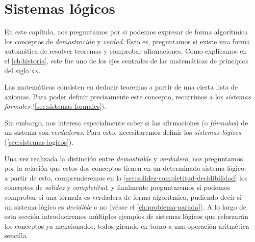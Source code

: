 

\chapter{Sistemas lógicos}\label{ch:sistemas-logicos}

En este capítulo, nos preguntamos por si podemos expresar de forma algorítmica los conceptos de \emph{demostración} y \emph{verdad}. Esto es, preguntamos si existe una forma automática de resolver teoremas y comprobar afirmaciones. Como explicamos en el \cref{ch:historia}, este fue uno de los ejes centrales de las matemáticas de principios del siglo \textsc{xx}.

Las matemáticas consisten en deducir teoremas a partir de una cierta lista de axiomas. Para poder definir precisamente este concepto, recurrimos a los \emph{sistemas formales} (\cref{sec:sistemas-formales}).

Sin embargo, nos interesa especialmente saber si las afirmaciones (o \emph{fórmulas}) de un sistema son \emph{verdaderas}. Para esto, necesitaremos definir los \emph{sistemas lógicos} (\cref{sec:sistemas-logicos}).

Una vez realizada la distinción entre \emph{demostrable} y \emph{verdadero}, nos preguntamos por la relación que estos dos conceptos tienen en un determinado sistema lógico: a partir de esto, comprenderemos en la \cref{sec:solidez-completitud-decidibilidad} los conceptos de \emph{solidez} y \emph{completitud}, y finalmente preguntaremos si podemos comprobar si una fórmula es verdadera de forma algorítmica, pudiendo decir si un sistema lógico es \emph{decidible} o no (véase el \cref{ch:problema-parada}). A lo largo de esta sección introduciremos múltiples ejemplos de sistemas lógicos que reforzarán los conceptos ya mencionados, todos girando en torno a una operación aritmética sencilla.

